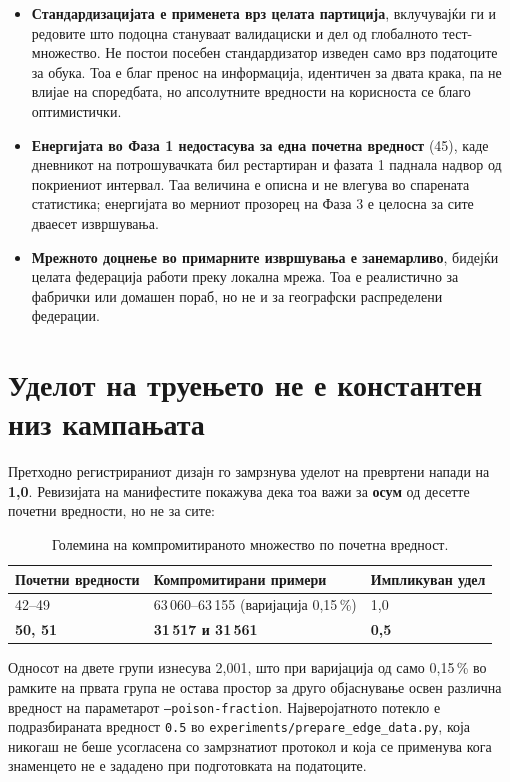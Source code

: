 \begin{itemize}
  \item \textbf{Стандардизацијата е применета врз целата партиција}, вклучувајќи ги и редовите што подоцна стануваат валидациски и дел од глобалното тест-множество. Не постои посебен стандардизатор изведен само врз податоците за обука. Тоа е благ пренос на информација, идентичен за двата крака, па не влијае на споредбата, но апсолутните вредности на корисноста се благо оптимистички.
  \item \textbf{Енергијата во Фаза 1 недостасува за една почетна вредност} (45), каде дневникот на потрошувачката бил рестартиран и фазата 1 паднала надвор од покриениот интервал. Таа величина е описна и не влегува во спарената статистика; енергијата во мерниот прозорец на Фаза 3 е целосна за сите дваесет извршувања.
  \item \textbf{Мрежното доцнење во примарните извршувања е занемарливо}, бидејќи целата федерација работи преку локална мрежа. Тоа е реалистично за фабрички или домашен пораб, но не и за географски распределени федерации.
\end{itemize}

\section{Уделот на труењето не е константен низ кампањата}
\label{subsec:poison-fraction}

Претходно регистрираниот дизајн го замрзнува уделот на превртени напади на \textbf{1,0}. Ревизијата
на манифестите покажува дека тоа важи за \textbf{осум} од десетте почетни вредности, но не за сите:

\begin{table}[htbp]
\centering
\caption{Големина на компромитираното множество по почетна вредност.}
\label{tab:poison-fraction}
\begin{tabular}{lll}
\toprule
Почетни вредности & Компромитирани примери & Импликуван удел \\
\midrule
42--49 & 63\,060--63\,155 (варијација 0,15\,\%) & 1,0 \\
\textbf{50, 51} & \textbf{31\,517 и 31\,561} & \textbf{0,5} \\
\bottomrule
\end{tabular}
\end{table}

Односот на двете групи изнесува 2,001, што при варијација од само 0,15\,\% во рамките на првата
група не остава простор за друго објаснување освен различна вредност на параметарот
\texttt{--poison-fraction}. Најверојатното потекло е подразбираната вредност \texttt{0.5} во
\texttt{experiments/prepare\_edge\_data.py}, која никогаш не беше усогласена со замрзнатиот протокол и
која се применува кога знаменцето не е зададено при подготовката на податоците.

